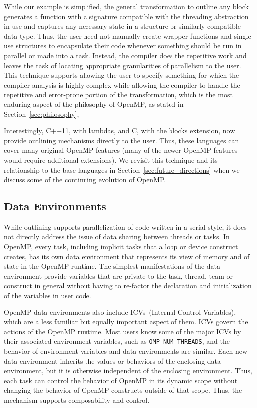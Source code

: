 While our example is simplified, the general transformation to outline any 
block generates a function 
with a signature compatible with the threading abstraction in use and captures
any necessary state in a structure or similarly compatible data type. Thus, 
the user need not manually create wrapper functions and single-use structures 
to encapsulate their code whenever something should be run in parallel or 
made into a task. Instead, the compiler does the repetitive work and leaves
the task of locating appropriate granularities of parallelism to the user.
This technique supports allowing the user to specify something for which the
compiler analysis is highly complex while allowing the compiler to handle the
repetitive and error-prone portion of the transformation, which is the most 
enduring aspect of the philosophy of OpenMP, as stated in 
Section~\ref{sec:philosophy}, 

Interestingly, C++11, with lambdas, and C, with the blocks extension, now 
provide outlining mechanisms directly to the user. Thus, these languages
can cover many original OpenMP features (many of the newer OpenMP features
would require additional extensions). We revisit this technique and its
relationship to the base languages in Section~\ref{sec:future_directions} 
when we discuss some of the continuing evolution of OpenMP.

\subsection{Data Environments}
\label{sub:data_environments}

While outlining supports parallelization of code written in a serial style, 
it does not directly address the issue of data sharing between threads or 
tasks. In OpenMP, every task, including implicit tasks that a loop or 
device construct creates, has its own data environment that represents its 
view of memory and of state in the OpenMP runtime. The simplest manifestations
of the data environment provide variables that are private to the task, 
thread, team or construct in general without having to re-factor the 
declaration and initialization of the variables in user code.

OpenMP data environments also include ICVs~(Internal Control Variables),
which are a less familiar but equally important aspect of them. ICVs govern
the actions of the OpenMP runtime. Most users know some of the major ICVs by 
their associated environment variables, such as \texttt{OMP\_NUM\_THREADS}, 
and the behavior of environment variables and data environments are similar. 
Each new data environment inherits the values or behaviors of the enclosing 
data environment, but it is otherwise independent of the enclosing environment.
Thus, each task can control the behavior of OpenMP in its dynamic scope 
without changing the behavior of OpenMP constructs outside of that scope.
Thus, the mechanism supports composability and control.

